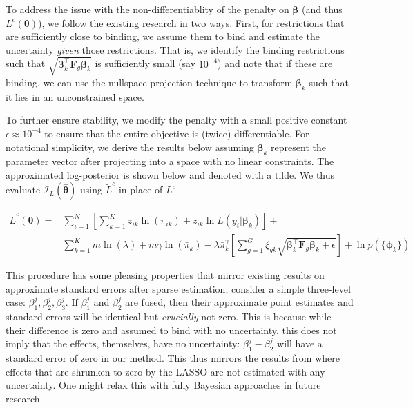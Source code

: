 To address the issue with the non-differentiablity of the penalty on $\bm{\beta}$ (and thus $L^c(\bm{\theta})$), we follow the existing research in two ways. First, for restrictions that
are sufficiently close to binding, we assume them to bind and estimate the uncertainty \emph{given} those restrictions. That is, we identify the binding restrictions such that $\sqrt{\bm{\beta}_k^\top\bm{F}_g\bm{\beta}_k}$ is sufficiently small (say $10^{-4}$) and note that if these are binding, we can use the nullspace projection technique to transform $\bm{\beta}_k$ such that it lies in an unconstrained space. 

To further ensure stability, we modify the penalty with a small positive constant $\epsilon \approx 10^{-4}$ to ensure that the entire objective is (twice) differentiable. For notational simplicity, we derive the results below assuming $\bm{\beta}_k$ represent the parameter vector after projecting into a space with no linear constraints. The approximated log-posterior is shown below and denoted with a tilde. We thus evaluate $\mathcal{I}_L(\hat{\bm{\theta}})$ using $\tilde{L}^c$ in place of $L^c$.

\begin{equation}
\begin{aligned}
\tilde{L}^c(\bm{\theta}) = &\sum_{i=1}^N \left[\sum_{k=1}^K z_{ik} \ln(\pi_{ik}) + z_{ik} \ln L(y_i | \bm{\beta}_k)\right] + \\ &\sum_{k=1}^K m \ln(\lambda) + m \gamma \ln(\bar{\pi}_k) - \lambda \bar{\pi}^\gamma_k \left[\sum_{g=1}^G \xi_{gk} \sqrt{\bm{\beta}^\top_k \bm{F}_{g} \bm{\beta}_k + \epsilon}\right] + \ln p(\{\bm{\phi}_k\})
\end{aligned}
\end{equation}

This procedure has some pleasing properties that mirror existing results on approximate standard errors after sparse estimation; consider a simple three-level case: $\beta^j_1, \beta^j_2, \beta^j_3$. If $\beta^j_1$ and $\beta^j_2$ are fused, then their approximate point estimates and standard errors will be identical but \emph{crucially} not zero. This is because while their difference is zero and assumed to bind with no uncertainty, this does not imply that the effects, themselves, have no uncertainty: $\beta^j_1 - \beta^j_2$ will have a standard error of zero in our method. This thus mirrors the results from \cite{fan2001variable} where effects that are shrunken to zero by the LASSO are not estimated with any uncertainty. One might relax this with fully Bayesian approaches in future research.

